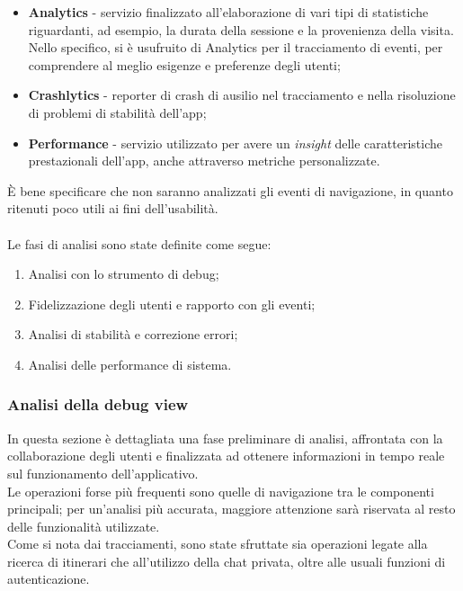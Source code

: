 \documentclass{natourDoc}
\begin{document}
\begin{itemize}
	\item \textbf{Analytics} -  servizio finalizzato all'elaborazione di vari tipi di statistiche riguardanti, ad esempio, la durata della sessione e la provenienza della visita. 
								Nello specifico, si è usufruito di Analytics per il tracciamento di eventi, per comprendere al meglio esigenze e preferenze degli utenti;
	\item \textbf{Crashlytics} - reporter di crash di ausilio nel tracciamento e nella risoluzione di problemi di stabilità dell'app; 
	\item \textbf{Performance} - servizio utilizzato per avere un \textit{insight} delle caratteristiche prestazionali dell'app, anche attraverso metriche personalizzate.
\end{itemize}

È bene specificare che non saranno analizzati gli eventi di navigazione, in quanto
ritenuti poco utili ai fini dell'usabilità. \\\\
Le fasi di analisi sono state definite come segue:
\begin{enumerate}
	\item Analisi con lo strumento di debug;
	\item Fidelizzazione degli utenti e rapporto con gli eventi;
	\item Analisi di stabilità e correzione errori;
	\item Analisi delle performance di sistema.
\end{enumerate}

\newpage

\subsubsection{Analisi della debug view}
In questa sezione è dettagliata una fase preliminare di analisi, 
affrontata con la collaborazione degli utenti e finalizzata ad ottenere informazioni 
in tempo reale sul funzionamento dell'applicativo. \\
Le operazioni forse più frequenti sono quelle di navigazione tra le componenti principali; per un'analisi più accurata, 
maggiore attenzione sarà riservata al resto delle funzionalità utilizzate. \\
Come si nota dai tracciamenti, sono state sfruttate sia operazioni legate alla ricerca di itinerari che all'utilizzo 
della chat privata, oltre alle usuali funzioni di autenticazione.
\end{document}
